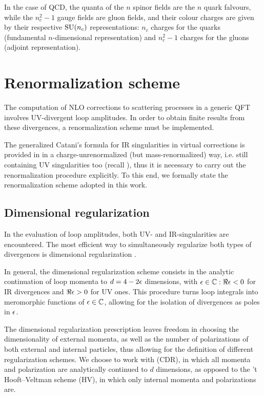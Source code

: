 In the case of QCD, the quanta of the $ n $ spinor fields are the $ n $ quark falvours, while the $ n_c^2 - 1 $ gauge fields are gluon fields, and their colour charges are given by their respective $ \mathrm{SU}(n_c) $ representations: $ n_c $ charges for the quarks (fundamental $ n $-dimensional representation) and $ n_c^2 - 1 $ charges for the gluons (adjoint representation).

\section{Renormalization scheme}
\label{sec:renorm}

The computation of NLO corrections to scattering processes in a generic QFT involves UV-divergent loop amplitudes. In order to obtain finite results from these divergences, a renormalization scheme must be implemented.

The generalized Catani's formula for IR singularities in virtual corrections is provided in \cite{Catani-2001} in a charge-unrenormalized (but mass-renormalized) way, i.e. still containing UV singularities too (recall ), thus it is necessary to carry out the renormalization procedure explicitly. To this end, we formally state the renormalization scheme adopted in this work.

\subsection{Dimensional regularization}
\label{ssec:dim-reg}

In the evaluation of loop amplitudes, both UV- and IR-singularities are encountered. The most efficient way to simultaneously regularize both types of divergences is dimensional regularization \cite{Thooft-1972, Bollini-1972}.

In general, the dimensional regularization scheme consists in the analytic continuation of loop momenta to $ d = 4 - 2 \epsilon $ dimensions, with $ \epsilon \in \mathbb{C} : \Re\epsilon < 0 $ for IR divergences and $ \Re\epsilon > 0 $ for UV ones. This procedure turns loop integrals into meromorphic functions of $ \epsilon \in \mathbb{C} $, allowing for the isolation of divergences as poles in $ \epsilon $.

The dimensional regularization prescription leaves freedom in choosing the dimensionality of external momenta, as well as the number of polarizations of both external and internal particles, thus allowing for the definition of different regularization schemes. We choose to work with  (CDR), in which all momenta and polarization are analytically continued to $ d $ dimensions, as opposed to the 't Hooft--Veltman scheme (HV), in which only internal momenta and polarizations are.

